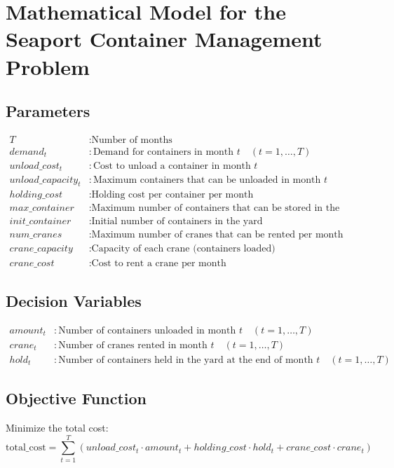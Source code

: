 \documentclass{article}
\begin{document}
\section*{Mathematical Model for the Seaport Container Management Problem}

\subsection*{Parameters}
\begin{align*}
T & : \text{Number of months} \\
demand_{t} & : \text{Demand for containers in month } t \quad (t = 1, \ldots, T) \\
unload\_cost_{t} & : \text{Cost to unload a container in month } t \\
unload\_capacity_{t} & : \text{Maximum containers that can be unloaded in month } t \\
holding\_cost & : \text{Holding cost per container per month} \\
max\_container & : \text{Maximum number of containers that can be stored in the yard} \\
init\_container & : \text{Initial number of containers in the yard} \\
num\_cranes & : \text{Maximum number of cranes that can be rented per month} \\
crane\_capacity & : \text{Capacity of each crane (containers loaded)} \\
crane\_cost & : \text{Cost to rent a crane per month}
\end{align*}

\subsection*{Decision Variables}
\begin{align*}
amount_{t} & : \text{Number of containers unloaded in month } t \quad (t = 1, \ldots, T) \\
crane_{t} & : \text{Number of cranes rented in month } t \quad (t = 1, \ldots, T) \\
hold_{t} & : \text{Number of containers held in the yard at the end of month } t \quad (t = 1, \ldots, T)
\end{align*}

\subsection*{Objective Function}
Minimize the total cost:
\[
\text{total\_cost} = \sum_{t=1}^{T} (unload\_cost_{t} \cdot amount_{t} + holding\_cost \cdot hold_{t} + crane\_cost \cdot crane_{t})
\]
\end{document}

